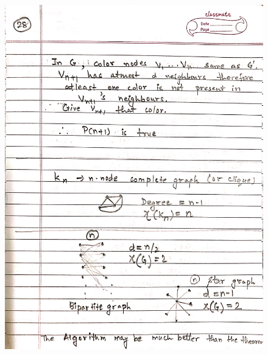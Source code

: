 \begin{figure}[H]
    \centering
    \includegraphics[width=16cm, height=21cm]{"./MIT-6.042J/MIT-6042J-028"}
\end{figure}
\newpage
